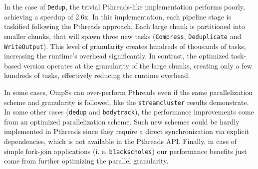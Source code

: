 In the case of \texttt{Dedup}, the trivial Pthreads-like implementation performs poorly, achieving a speedup of 2.6x. 
In this implementation, each pipeline stage is taskified following the Pthreads approach. 
Each large chunk is partitioned into smaller chunks, that will spawn three new tasks (\texttt{Compress}, \texttt{Deduplicate}
and \texttt{WriteOutput}). 
This level of granularity creates hundreds of thousands of tasks, increasing the runtime's overhead significantly. 
In contrast, the optimized task-based version operates at the granularity of the large chunks, creating only a few hundreds of tasks, effectively reducing the runtime overhead. 

In some cases, OmpSs can over-perform Pthreads even if the same parallelization scheme and granularity is followed, like the \texttt{streamcluster} results demonstrate.
In some other cases (\texttt{dedup} and \texttt{bodytrack}), the performance improvements come from an optimized parallelization scheme.
Such new schemes could be hardly implemented in Pthreads since they require a direct synchronization via explicit dependencies, which is not available in the Pthreads API.
Finally, in case of simple fork-join applications (i. e. \texttt{blackscholes}) our performance benefits just come from further optimizing the parallel granularity.


